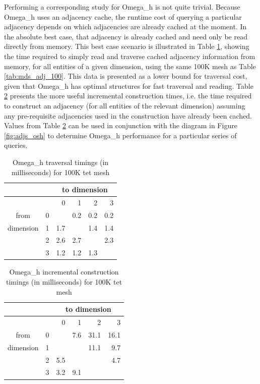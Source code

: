 Performing a corresponding study for Omega\_h is not quite
trivial.
Because Omega\_h uses an adjacency cache, the runtime cost
of querying a particular adjacency depends on which adjacencies
are already cached at the moment.
In the absolute best case, that adjacency is already cached and
need only be read directly from memory.
This best case scenario is illustrated in Table \ref{tab:osh_walk_100},
showing the time required to simply read and traverse cached adjacency
information from memory, for all entities of a given dimension,
using the same 100K mesh as Table \ref{tab:mds_adj_100}.
This data is presented as a lower bound for traversal cost, given
that Omega\_h has optimal structures for fast traversal and reading.
Table \ref{tab:osh_adj_100} presents the more useful incremental construction
times, i.e. the time required to construct an adjacency
(for all entities of the relevant dimension)
assuming any pre-requisite adjacencies used in the construction
have already been cached.
Values from Table \ref{tab:osh_adj_100} can be used in conjunction
with the diagram in Figure \ref{fig:adjs_osh} to determine
Omega\_h performance for a particular series of queries.

\begin{table}
\caption{Omega\_h traversal timings (in milliseconds) for 100K tet mesh}
\label{tab:osh_walk_100}
\begin{center}
\begin{tabular}{|c|r|r r r r}
               &   & \multicolumn{4}{c}{to dimension} \\\hline
               &   &    0 &    1 &    2 &   3  \\\hline
from           & 0 &      &  0.2 &  0.2 &  0.2 \\
dimension      & 1 &  1.7 &      &  1.4 &  1.4 \\
               & 2 &  2.6 &  2.7 &      &  2.3 \\
               & 3 &  1.2 &  1.2 &  1.3 &      \\
\end{tabular}
\end{center}
\end{table}

\begin{table}
\caption{Omega\_h incremental construction timings (in milliseconds) for 100K tet mesh}
\label{tab:osh_adj_100}
\begin{center}
\begin{tabular}{|c|r|r r r r}
               &   & \multicolumn{4}{c}{to dimension} \\\hline
               &   &    0 &    1 &    2 &   3  \\\hline
from           & 0 &      &  7.6 & 31.1 & 16.1 \\
dimension      & 1 &      &      & 11.1 &  9.7 \\
               & 2 &  5.5 &      &      &  4.7 \\
               & 3 &  3.2 &  9.1 &      &      \\
\end{tabular}
\end{center}
\end{table}


